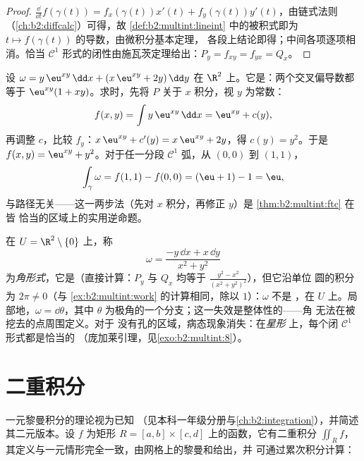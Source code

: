 \begin{proof}
$\frac{\dd}{\dd t}f(\gamma(t)) = f_x(\gamma(t))x'(t) +
f_y(\gamma(t))y'(t)$，由链式法则
（\cref{ch:b2:diffcalc}）可得，故
\cref{def:b2:multint:lineint} 中的被积式即为 $t \mapsto
f(\gamma(t))$ 的导数，由微积分基本定理，
各段上结论即得；中间各项逐项相消。恰当
$\mathcal{C}^1$ 形式的闭性由施瓦茨定理给出：$P_y =
f_{xy} = f_{yx} = Q_x$。
\end{proof}

\begin{example}[重构势函数]\label{ex:b2:multint:potential}
设 $\omega = y\,\eu^{xy}\,\dd x + (x\,\eu^{xy} + 2y)\,\dd y$
在 $\R^2$ 上。它是：两个交叉偏导数都等于
$\eu^{xy}(1 + xy)$。求时，先将 $P$ 关于
$x$ 积分，视 $y$ 为常数：
\[
f(x, y) = \int y\,\eu^{xy}\,\dd x = \eu^{xy} + c(y),
\]
再调整 $c$，比较 $f_y$：$x\,\eu^{xy} + c'(y) =
x\,\eu^{xy} + 2y$，得 $c(y) = y^2$。于是 $f(x,y) = \eu^{xy} +
y^2$。对于任一分段 $\mathcal C^1$ 弧，从 $(0,0)$
到 $(1,1)$，
\[
\int_\gamma\omega = f(1,1) - f(0,0) = (\eu + 1) - 1 = \eu ,
\]
与路径无关——这一两步法（先对
$x$ 积分，再修正 $y$）是
\cref{thm:b2:multint:ftc} 在皆
恰当的区域上的实用逆命题。
\end{example}

\begin{example}[闭形式未必恰当]\label{ex:b2:multint:angleform}
在 $U = \R^2 \setminus \{0\}$ 上，称
\[
\omega = \frac{-y\,\dd x + x\,\dd y}{x^2 + y^2}
\]
为\emph{角形式}，它是（直接计算：$P_y$ 与 $Q_x$ 均等于
$\frac{y^2 - x^2}{(x^2+y^2)^2}$），但它沿单位
圆的积分为 $2\pi \neq 0$（与
\cref{ex:b2:multint:work} 的计算相同，除以 $1$）：$\omega$ 不是
，在 $U$ 上。局部地，$\omega = \dd\theta$，其中
$\theta$ 为极角的一个分支；这一失效是整体性的——角
无法在被挖去的点周围定义。对于
没有孔的区域，病态现象消失：在\emph{星形}
上，每个闭 $\mathcal{C}^1$ 形式都是恰当的
（庞加莱引理，见\cref{exo:b2:multint:8}）。
\end{example}

\section{二重积分}

一元黎曼积分的理论视为已知
（见本科一年级分册与\cref{ch:b2:integration}），并简述
其二元版本。设 $f$ 为矩形
$R = [a, b] \times [c, d]$ 上的函数，它有二重积分 $\iint_R f$，
其定义与一元情形完全一致，由网格上的黎曼和给出，并
可通过累次积分计算：

